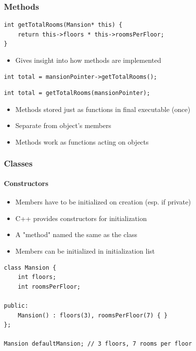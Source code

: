 \documentclass[table]{beamer}
\newcommand{\declarelesson}{\textbf{\color{themegreen}{Lesson:}} }
\newcommand{\declarebts}{\textbf{\color{themeorange}{Behind the Scenes:}} }
\begin{document}
\begin{frame}[fragile]
    \frametitle{\declarebts Methods }
    \begin{lstlisting}[title=\texttt{this} pointer idiom in C]
int getTotalRooms(Mansion* this) {
    return this->floors * this->roomsPerFloor;
}
    \end{lstlisting}
    \begin{itemize}
        \item Gives insight into how methods are implemented
    \end{itemize}
    \begin{lstlisting}[title=Calling an object's method]
int total = mansionPointer->getTotalRooms();
    \end{lstlisting}
    \begin{lstlisting}[title=Behind the scenes]
int total = getTotalRooms(mansionPointer);
    \end{lstlisting}
    \begin{itemize}
        \item Methods stored just as functions in final executable (once)
        \item Separate from object's members
        \item Methods work as functions acting on objects
    \end{itemize}
\end{frame}



\begin{frame}[fragile]
    \frametitle{\declarelesson Classes }
    \framesubtitle{Constructors}
    \begin{itemize}
        \item Members have to be initialized on creation (esp. if private)
        \item C++ provides constructors for initialization
        \item A "method" named the same as the class
        \item Members can be initialized in initialization list
    \end{itemize}
    \begin{lstlisting}[title=Default Constructor]
class Mansion {
    int floors;
    int roomsPerFloor;

public:
    Mansion() : floors(3), roomsPerFloor(7) { }
};

Mansion defaultMansion; // 3 floors, 7 rooms per floor
    \end{lstlisting}
\end{frame}
\end{document}
